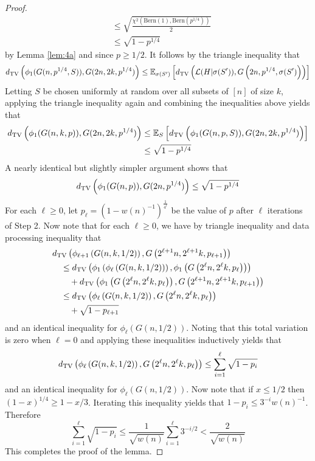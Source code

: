\begin{proof}
\begin{align*}
&\le \sqrt{\frac{\chi^2(\text{Bern}(1), \text{Bern}(p^{1/4}))}{2}} \\
&\le \sqrt{1-p^{1/4}}
\end{align*}
by Lemma \ref{lem:4a} and since $p \ge 1/2$. It follows by the triangle inequality that
$$d_{\text{TV}}\left( \phi_1(G(n, p^{1/4}, S)), G(2n, 2k, p^{1/4}) \right) \le \mathbb{E}_{\sigma(S')} \left[ d_{\text{TV}}\left(\mathcal{L}(H | \sigma(S')), G\left(2n, p^{1/4}, \sigma(S')\right) \right) \right]$$
Letting $S$ be chosen uniformly at random over all subsets of $[n]$ of size $k$, applying the triangle inequality again and combining the inequalities above yields that
\begin{align*}
d_{\text{TV}}\left( \phi_1(G(n, k, p)), G(2n, 2k, p^{1/4}) \right) &\le \mathbb{E}_S\left[ d_{\text{TV}}\left( \phi_1(G(n, p, S)), G(2n, 2k, p^{1/4}) \right) \right] \\
&\le\sqrt{1-p^{1/4}}
\end{align*}
A nearly identical but slightly simpler argument shows that
$$d_{\text{TV}}\left( \phi_1(G(n, p)), G(2n, p^{1/4}) \right) \le \sqrt{1-p^{1/4}}$$
For each $\ell \ge 0$, let $p_\ell = \left(1 -w(n)^{-1}\right)^{\frac{1}{4^\ell}}$ be the value of $p$ after $\ell$ iterations of Step 2. Now note that for each $\ell \ge 0$, we have by triangle inequality and data processing inequality that
\begin{align*}
&d_{\text{TV}}\left( \phi_{\ell + 1}\left(G(n, k, 1/2)\right), G\left(2^{\ell+1} n, 2^{\ell+1} k, p_{\ell+1} \right) \right) \\
&\quad\le d_{\text{TV}}\left( \phi_1\left(\phi_\ell\left(G(n, k, 1/2)\right) \right), \phi_1\left(G\left(2^\ell n, 2^\ell k, p_\ell \right) \right) \right) \\
&\quad \quad + d_{\text{TV}}\left( \phi_1\left(G\left(2^\ell n, 2^\ell k, p_\ell \right) \right), G\left(2^{\ell+1} n, 2^{\ell+1} k, p_{\ell+1} \right) \right) \\
&\quad\le d_{\text{TV}}\left( \phi_\ell\left(G(n, k, 1/2)\right), G\left(2^\ell n, 2^\ell k, p_\ell \right) \right) \\
&\quad \quad + \sqrt{1-p_{\ell+1}}
\end{align*}
and an identical inequality for $\phi_\ell(G(n, 1/2))$. Noting that this total variation is zero when $\ell = 0$ and applying these inequalities inductively yields that
$$d_{\text{TV}}\left( \phi_\ell\left(G(n, k, 1/2)\right), G\left(2^\ell n, 2^\ell k, p_\ell \right) \right) \le \sum_{i = 1}^\ell \sqrt{1-p_{i}}$$
and an identical inequality for $\phi_\ell(G(n, 1/2))$. Now note that if $x \le 1/2$ then $(1 - x)^{1/4} \ge 1 - x/3$. Iterating this inequality yields that $1 - p_{i} \le 3^{-i} w(n)^{-1}$. Therefore
$$\sum_{i = 1}^\ell \sqrt{1-p_{i}} \le \frac{1}{\sqrt{w(n)}} \sum_{i = 1}^\ell 3^{-i/2} < \frac{2}{\sqrt{w(n)}}$$
This completes the proof of the lemma.
\end{proof}

